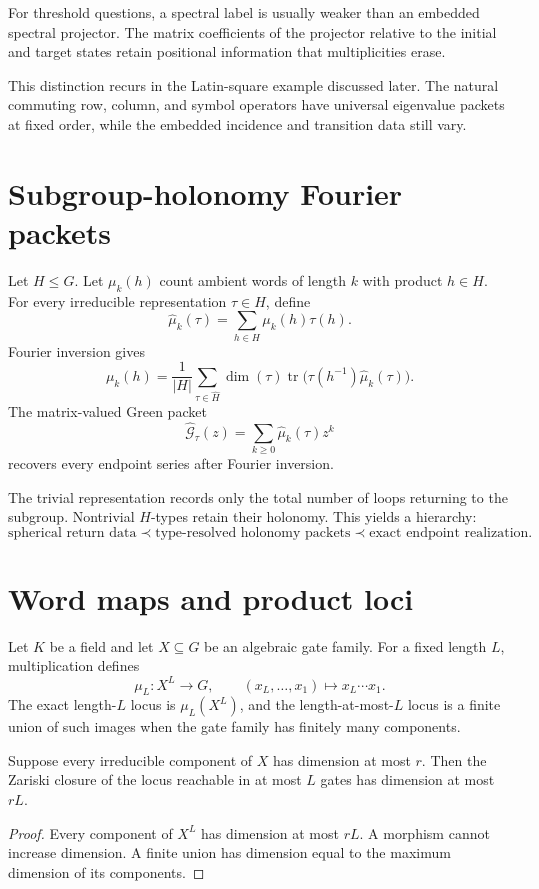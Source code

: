 \begin{principle}
For threshold questions, a spectral label is usually weaker than an embedded spectral projector.  The matrix coefficients of the projector relative to the initial and target states retain positional information that multiplicities erase.
\end{principle}

This distinction recurs in the Latin-square example discussed later.  The natural commuting row, column, and symbol operators have universal eigenvalue packets at fixed order, while the embedded incidence and transition data still vary.

\section{Subgroup-holonomy Fourier packets}
Let $H\le G$.  Let $\mu_k(h)$ count ambient words of length $k$ with product $h\in H$.  For every irreducible representation $\tau\in\widehat H$, define
\[
\widehat\mu_k(\tau)
=
\sum_{h\in H}\mu_k(h)\tau(h).
\]
Fourier inversion gives
\[
\mu_k(h)
=
\frac1{|H|}
\sum_{\tau\in\widehat H}
\dim(\tau)
\operatorname{tr}
\bigl(
\tau(h^{-1})\widehat\mu_k(\tau)
\bigr).
\]
The matrix-valued Green packet
\[
\widehat{\mathcal G}_\tau(z)
=
\sum_{k\ge0}\widehat\mu_k(\tau)z^k
\]
recovers every endpoint series after Fourier inversion.

The trivial representation records only the total number of loops returning to the subgroup.  Nontrivial $H$-types retain their holonomy.  This yields a hierarchy:
\[
\text{spherical return data}
\prec
\text{type-resolved holonomy packets}
\prec
\text{exact endpoint realization}.
\]

\section{Word maps and product loci}
Let $K$ be a field and let $X\subseteq G$ be an algebraic gate family.  For a fixed length $L$, multiplication defines
\[
\mu_L:X^L\to G,
\qquad
(x_L,\ldots,x_1)\mapsto x_L\cdots x_1.
\]
The exact length-$L$ locus is $\mu_L(X^L)$, and the length-at-most-$L$ locus is a finite union of such images when the gate family has finitely many components.

\begin{theorem}
Suppose every irreducible component of $X$ has dimension at most $r$.  Then the Zariski closure of the locus reachable in at most $L$ gates has dimension at most $rL$.
\end{theorem}
\begin{proof}
Every component of $X^L$ has dimension at most $rL$.  A morphism cannot increase dimension.  A finite union has dimension equal to the maximum dimension of its components.
\end{proof}

